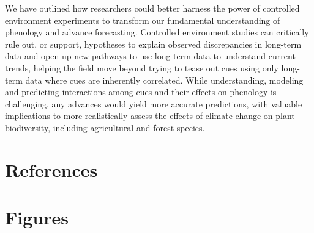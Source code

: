 \documentclass[11pt,letter]{article}
\begin{document}
We have outlined how researchers could better harness the power of controlled environment experiments to transform our fundamental understanding of phenology and advance forecasting. Controlled environment studies can critically rule out, or support, hypotheses to explain observed discrepancies in long-term data and open up new pathways to use long-term data to understand current trends, helping the field move beyond trying to tease out cues using only long-term data where cues are inherently correlated. While understanding, modeling and predicting interactions among cues and their effects on phenology is challenging, any advances would yield more accurate predictions, with valuable implications to more realistically assess the effects of climate change on plant biodiversity, including agricultural and forest species. 


\section{References}



\section{Figures}
\end{document}
